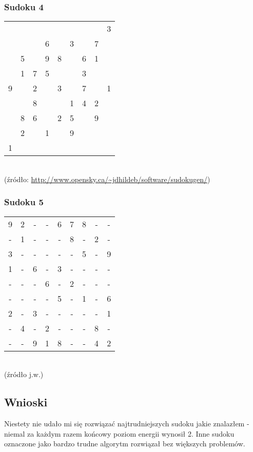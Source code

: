     \subsubsection{Sudoku 4}
    \begin{tabular}{ccc|ccc|ccc}
         & & & & & & & &3\\
        & & &6& &3& &7& \\
        &5& &9&8& &6&1& \\ \hline
        &1&7&5& & &3& & \\
        9& &2& &3& &7& &1\\
        & &8& & &1&4&2& \\ \hline
        &8&6& &2&5& &9& \\
        &2& &1& &9& & & \\
        1& & & & & & & & \\
        \end{tabular}\\
        (źródło: \url{http://www.opensky.ca/~jdhildeb/software/sudokugen/})\\
             
    \subsubsection{Sudoku 5}
    \begin{tabular}{ccc|ccc|ccc}
        9&2&-&-&6&7&8&-&-\\
        -&1&-&-&-&8&-&2&-\\
        3&-&-&-&-&-&5&-&9\\ \hline
        1&-&6&-&3&-&-&-&-\\
        -&-&-&6&-&2&-&-&-\\
        -&-&-&-&5&-&1&-&6\\ \hline
        2&-&3&-&-&-&-&-&1\\
        -&4&-&2&-&-&-&8&-\\
        -&-&9&1&8&-&-&4&2\\
    \end{tabular}\\
    (źródło j.w.)\\
\subsection{Wnioski}
Niestety nie udało mi się rozwiązać najtrudniejszych sudoku jakie znalazłem - niemal za każdym razem końcowy poziom energii wynosił 2. Inne sudoku oznaczone jako bardzo trudne algorytm rozwiązał bez większych problemów.
